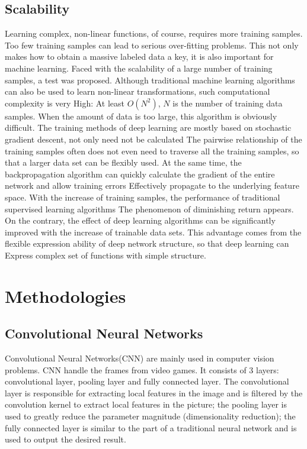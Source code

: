 \documentclass[11pt,en]{elegantpaper}
\begin{document}
\subsection{Scalability}
Learning complex, non-linear functions, of course, requires more training samples. Too few training samples can lead to serious over-fitting problems. This not only makes how to obtain a massive labeled data a key, it is also important for machine learning. Faced with the scalability of a large number of training samples, a test was proposed. Although traditional machine learning algorithms can also be used to learn non-linear transformations, such computational complexity is very High: At least $O(N^2)$, $N$ is the number of training data samples. When the amount of data is too large, this algorithm is obviously difficult. The training methods of deep learning are mostly based on stochastic gradient descent, not only need not be calculated The pairwise relationship of the training samples often does not even need to traverse all the training samples, so that a larger data set can be flexibly used. At the same time, the backpropagation algorithm can quickly calculate the gradient of the entire network and allow training errors Effectively propagate to the underlying feature space\cite{37}. With the increase of training samples, the performance of traditional supervised learning algorithms The phenomenon of diminishing return appears. On the contrary, the effect of deep learning algorithms can be significantly improved with the increase of trainable data sets. This advantage comes from the flexible expression ability of deep network structure, so that deep learning can Express complex set of functions with simple structure.

\section{Methodologies}
\subsection{Convolutional Neural Networks}
Convolutional Neural Networks(CNN) are mainly used in computer vision problems. CNN handle the frames from video games. It consists of 3 layers: convolutional layer, pooling layer and fully connected layer. The convolutional layer is responsible for extracting local features in the image and is filtered by the convolution kernel to extract local features in the picture; the pooling layer is used to greatly reduce the parameter magnitude (dimensionality reduction); the fully connected layer is similar to the part of a traditional neural network and is used to output the desired result.
\end{document}
